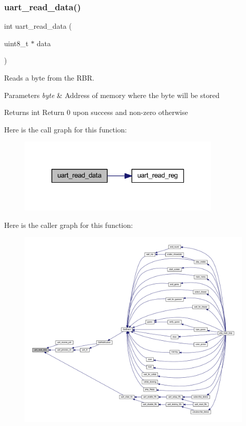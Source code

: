 \subsubsection{\texorpdfstring{uart\+\_\+read\+\_\+data()}{uart\_read\_data()}}
{\footnotesize\ttfamily int uart\+\_\+read\+\_\+data (\begin{DoxyParamCaption}\item[{uint8\+\_\+t $\ast$}]{data }\end{DoxyParamCaption})}



Reads a byte from the R\+BR. 


\begin{DoxyParams}{Parameters}
{\em byte} & Address of memory where the byte will be stored \\
\hline
\end{DoxyParams}
\begin{DoxyReturn}{Returns}
int Return 0 upon success and non-\/zero otherwise 
\end{DoxyReturn}
Here is the call graph for this function\+:\nopagebreak
\begin{figure}[H]
\begin{center}
\leavevmode
\includegraphics[width=273pt]{group__uart_ga25bafed3ff787360a644c19f0e5acd26_cgraph}
\end{center}
\end{figure}
Here is the caller graph for this function\+:\nopagebreak
\begin{figure}[H]
\begin{center}
\leavevmode
\includegraphics[width=350pt]{group__uart_ga25bafed3ff787360a644c19f0e5acd26_icgraph}
\end{center}
\end{figure}
